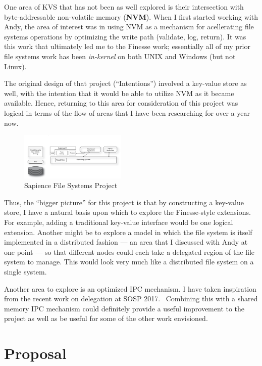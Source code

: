\documentclass[letterpaper,twocolumn,10pt]{article}
\begin{document}
One area of KVS that has not been as well explored is their intersection with byte-addressable
non-volatile memory (\textbf{NVM}).  When I first started working with Andy, the area of interest was in
using NVM as a mechanism for acellerating file systems operations by optimizing the write path (validate,
log, return). It was this work that ultimately led me to the Finesse work; essentially all of my prior file
systems work has been \textit{in-kernel} on both UNIX and Windows (but not Linux).

The original design of that project (``Intentions'') involved a key-value store as well, with the intention
that it would be able to utilize NVM as it became available.  Hence, returning to this area for consideration
of this project was logical in terms of the flow of areas that I have been researching for over a year now.

\begin{figure}
    \centering
    \caption{Sapience File Systems Project}\label{sapience}
    \includegraphics[width=0.45\textwidth]{figures/sapience.png}
\end{figure}

Thus, the ``bigger picture'' for this project is that by constructing a key-value store, I have a natural basis
upon which to explore the Finesse-style extensions.  For example, adding a traditional key-value interface would
be one logical extension.  Another might be to explore a model in which the file system is itself implemented
in a distributed fashion --- an area that I discussed with Andy at one point --- so that different nodes could
each take a delegated region of the file system to manage.  This would look very much like a distributed file
system on a single system.

Another area to explore is an optimized IPC mechanism.  I have taken inspiration from the recent work on delegation
at SOSP 2017.~\cite{roghanchi2017ffwd} Combining this with a shared memory IPC mechanism could definitely provide
a useful improvement to the project as well as be useful for some of the other work envisioned.

\section{Proposal}
\end{document}
